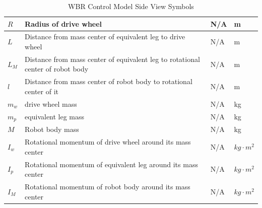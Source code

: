 \documentclass[12pt]{article}
\begin{document}
\begin{table}[H]
\begin{tabular}{|p{}|p{}|p{}|p{}|}
                    \hline $ R  $      & Radius of drive wheel                                                          & N/A                    & m           \\
                    \hline $ L  $      & Distance from mass center of equivalent leg to drive wheel                     & N/A                    & m           \\
                    \hline $ L_M  $    & Distance from mass center of equivalent leg to rotational center of robot body & N/A                    & m           \\
                    \hline $ l  $      & Distance from mass center of robot body to rotational center of it             & N/A                    & m           \\
                    \hline $ m_w  $    & drive wheel mass                                                               & N/A                    & kg          \\
                    \hline $ m_p  $    & equivalent leg mass                                                            & N/A                    & kg          \\
                    \hline $ M  $      & Robot body mass                                                                & N/A                    & kg          \\
                    \hline $ I_w  $    & Rotational momentum of drive wheel around its mass center                      & N/A                    & $kg\cdot m^2$ \\
                    \hline $ I_p  $    & Rotational momentum of equivalent leg around its mass center                   & N/A                    & $kg\cdot m^2$ \\
                    \hline $ I_M  $    & Rotational momentum of robot body around its mass center                       & N/A                    & $kg\cdot m^2$ \\
            
                    \hline
                \end{tabular}
                \caption{WBR Control Model Side View Symbols} \label{tbl:WBR Control Model Side View Symbols}
            \end{table}
\end{document}
